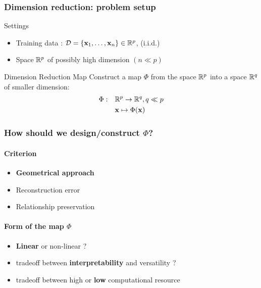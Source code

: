 \documentclass{beamer}\usepackage[]{graphicx}\usepackage[]{color}
\begin{document}
\begin{frame}
  \frametitle{Dimension reduction: problem setup}

    \begin{block}{Settings}
      \begin{itemize}
        \item \alert{Training data} : $\mathcal{D}=\{\mathbf{x}_1,\ldots,\mathbf{x}_n\} \in \mathbb{R}^p$,   (i.i.d.)
        \item Space $\mathbb{R}^p$ of possibly high dimension $(n \ll p)$
      \end{itemize}
    \end{block}

    \vfill
    
    \begin{block}{Dimension Reduction Map}
       Construct a map $\Phi$ from the space $\mathbb{R}^{p}$ into a space $\mathbb{R}^{q}$ of \alert{smaller dimension}:
      \begin{align*}
          \Phi:\quad & \mathbb{R}^p \to \mathbb{R}^{q}, q \ll p\\
                     & \mathbf{x} \mapsto \Phi(\mathbf{x})
      \end{align*}
    \end{block}
    
\end{frame}
 
\begin{frame}
  \frametitle{How should we design/construct $\Phi$?}

  \paragraph{Criterion}
  \begin{itemize}
    \item \alert{\bf Geometrical approach}
    \item Reconstruction error
    \item Relationship preservation
  \end{itemize}

  \vfill
  
  \paragraph{Form of the map $\Phi$}
  \begin{itemize}
    \item \alert{\bf Linear} or non-linear ?
    \item tradeoff between \alert{\bf interpretability} and versatility ?
    \item tradeoff between high or \alert{\bf low} computational resource
  \end{itemize}

\end{frame}
 
\end{document}
